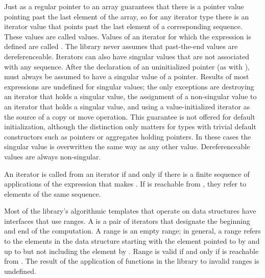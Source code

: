 \pnum
Just as a regular pointer to an array guarantees that there is a pointer value pointing past the last element
of the array, so for any iterator type there is an iterator value that points past the last element of a
corresponding sequence.
These values are called
values.
Values of an iterator
for which the expression
is defined are called
.
The library never assumes that past-the-end values are dereferenceable.
Iterators can also have singular values that are not associated with any
sequence.
\enterexample
After the declaration of an uninitialized pointer
(as with
),
must always be assumed to have a singular value of a pointer.
\exitexample
Results of most expressions are undefined for singular values;
the only exceptions are destroying an iterator that holds a singular value,
the assignment of a non-singular value to
an iterator that holds a singular value, and using a value-initialized iterator
as the source of a copy or move operation. \enternote This guarantee is not
offered for default initialization, although the distinction only matters for types
with trivial default constructors such as pointers or aggregates holding pointers.
\exitnote
In these cases the singular
value is overwritten the same way as any other value.
Dereferenceable
values are always non-singular.

\pnum
An iterator
is called
from an iterator
if and only if there is a finite sequence of applications of
the expression
that makes
.
If
is reachable from
,
they refer to elements of the same sequence.

\pnum
Most of the library's algorithmic templates that operate on data structures have interfaces that use ranges.
A
is a pair of iterators that designate the beginning and end of the computation.
A range 
is an empty range;
in general, a range 
refers to the elements in the data structure starting with the element
pointed to by
and up to but not including the element  by
.
Range 
is valid if and only if
is reachable from
.
The result of the application of functions in the library to invalid ranges is
undefined.


